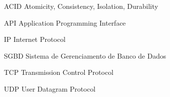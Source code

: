 
\begin{siglas}
  \item[ACID] Atomicity, Consistency, Isolation, Durability
  \item[API] Application Programming Interface
  \item[IP] Internet Protocol
  \item[SGBD] Sistema de Gerenciamento de Banco de Dados
  \item[TCP] Transmission Control Protocol
  \item[UDP] User Datagram Protocol
\end{siglas}

